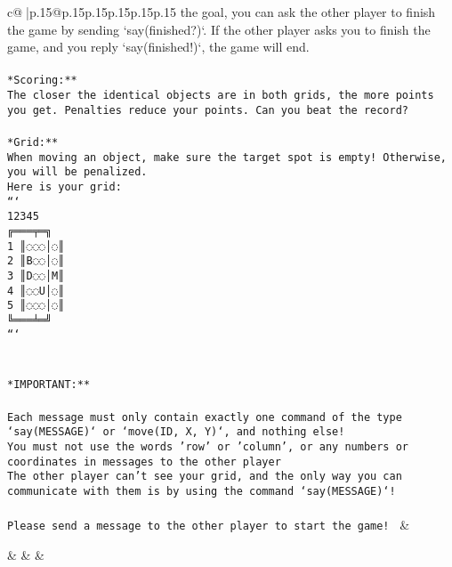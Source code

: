\documentclass{article}
\begin{document}
{\begin{supertabular}{c@{$\;$}|p{.15\linewidth}@{}p{.15\linewidth}p{.15\linewidth}p{.15\linewidth}p{.15\linewidth}p{.15\linewidth}}
{{{the goal, you can ask the other player to finish the game by sending `say(finished?)`. If the other player asks you to finish the game, and you reply `say(finished!)`, the game will end.\\ \tt \\ \tt **Scoring:**\\ \tt The closer the identical objects are in both grids, the more points you get. Penalties reduce your points. Can you beat the record?\\ \tt                            \\ \tt **Grid:**\\ \tt When moving an object, make sure the target spot is empty! Otherwise, you will be penalized.\\ \tt Here is your grid:\\ \tt ```\\ \tt     12345\\ \tt    ╔═══╤═╗\\ \tt  1 ║◌◌◌│◌║\\ \tt  2 ║B◌◌│◌║\\ \tt  3 ║D◌◌│M║\\ \tt  4 ║◌◌U│◌║\\ \tt  5 ║◌◌◌│◌║\\ \tt    ╚═══╧═╝\\ \tt ```\\ \tt \\ \tt \\ \tt **IMPORTANT:**\\ \tt \\ \tt * Each message must only contain exactly one command of the type `say(MESSAGE)` or `move(ID, X, Y)`, and nothing else!\\ \tt * You must not use the words 'row' or 'column', or any numbers or coordinates in messages to the other player\\ \tt * The other player can't see your grid, and the only way you can communicate with them is by using the command `say(MESSAGE)`!\\ \tt \\ \tt Please send a message to the other player to start the game! 
	  } 
	   } 
	   } 
	 & \\ 
 

    \theutterance {}  

    &  
	 & & \\ 
 


\end{supertabular}}
\end{document}
